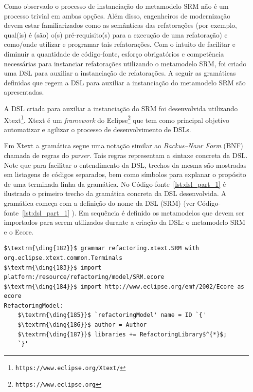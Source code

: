 Como observado o processo de instanciação do metamodelo SRM não é um processo trivial em ambas opções. Além disso, engenheiros de modernização devem estar familiarizados como as semânticas das refatorações (por exemplo, qual(is) é (são) o(s) pré-requisito(s) para a execução de uma refatoração) e como/onde utilizar e programar tais refatorações. Com o intuito de facilitar e diminuir a quantidade de código-fonte, esforço obrigatórios e competência necessárias para instanciar refatorações utilizando o metamodelo SRM, foi criado uma DSL para auxiliar a instanciação de refatorações. A seguir as gramáticas definidas que regem a DSL para auxiliar a instanciação do metamodelo SRM são apresentadas.

%
%
A DSL criada para auxiliar a instanciação do SRM foi desenvolvida utilizando Xtext\footnote{\texttt{https://www.eclipse.org/Xtext/}}. Xtext é um \textit{framework} do Eclipse\footnote{\texttt{https://www.eclipse.org}} que tem como principal objetivo automatizar e agilizar o processo de desenvolvimento de DSLs. %

Em Xtext a gramática segue uma notação similar ao \textit{Backus–Naur Form} (BNF) chamada de regras do \textit{parser}. Tais regras representam a sintaxe concreta da DSL. Note que para facilitar o entendimento da DSL, trechos da mesma são mostradas em listagens de códigos separados, bem como símbolos para explanar o propósito de uma terminada linha da gramática. No Código-fonte~\ref{lst:dsl_part_1} é ilustrado o primeiro trecho da gramática concreta da DSL desenvolvida. A gramática começa com a definição do nome da DSL (SRM) (ver Código-fonte~\ref{lst:dsl_part_1} ). Em sequência é definido os metamodelos que devem ser importados para serem utilizados durante a criação da DSL: o metamodelo SRM e o Ecore.


\begin{lstlisting}[language=Xtext, frame=single, basicstyle={\scriptsize}, mathescape=true, label={lst:dsl_part_1}, caption={Gramática da DSL - parte 1}]
$\textrm{\ding{182}}$ grammar refactoring.xtext.SRM with org.eclipse.xtext.common.Terminals 
$\textrm{\ding{183}}$ import platform:/resource/refactoring/model/SRM.ecore
$\textrm{\ding{184}}$ import http://www.eclipse.org/emf/2002/Ecore as ecore
RefactoringModel: 
	$\textrm{\ding{185}}$ `refactoringModel' name = ID `{'
	$\textrm{\ding{186}}$ author = Author
	$\textrm{\ding{187}}$ libraries += RefactoringLibrary$^{*}$;
	`}'
\end{lstlisting}


